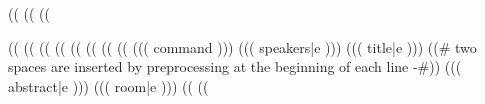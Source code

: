 ((%
((%
\newSmallTimeslot{}
((%

((%
((%
((%
((%
\noindent{}
\workshopspace((%
((%
((%
((%
\noindent((( command ))){%
  ((( speakers|e )))%
}{%
  ((( title|e )))%
}{%
}{%
((# two spaces are inserted by preprocessing at the beginning of each line -#))
((( abstract|e )))%
}%
{%
  ((( room|e )))%
}%
((%
((%


